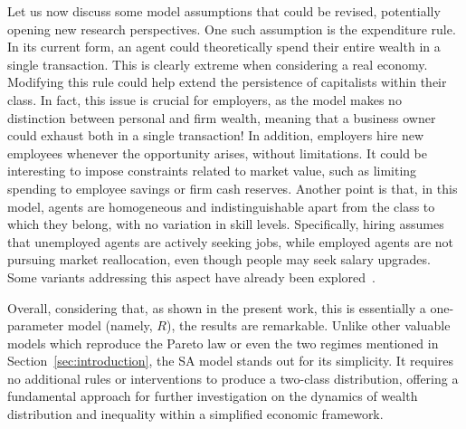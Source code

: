 Let us now discuss some model assumptions that could be revised, potentially opening new research perspectives. 
One such assumption is the expenditure rule. In its current form, an agent could theoretically spend their entire wealth in a single transaction. This is clearly extreme when considering a real economy. 
%
Modifying this rule could help extend the persistence of capitalists within their class. 
In fact, this issue is crucial for employers, as the model makes no distinction between personal and firm wealth, meaning that a business owner could exhaust both in a single transaction! 
In addition, employers hire new employees whenever the opportunity arises, without limitations. It could be interesting to impose constraints related to market value, such as limiting spending to employee savings or firm cash reserves.  Another point is that, in this model, agents are homogeneous and indistinguishable apart from the class to which they belong, with no variation in skill levels. Specifically, hiring assumes that unemployed agents are actively seeking jobs, while employed agents are not pursuing market reallocation, even though people may seek salary upgrades. Some variants addressing this aspect have already been explored~\cite{WRIGHT2010}. 
 
Overall, considering that, as shown in the present work, this is essentially a one-parameter model (namely, $R$),  the results are remarkable. 
Unlike other valuable models which reproduce the Pareto law or even the two regimes mentioned in Section~\ref{sec:introduction}, the SA model stands out for its simplicity. It requires no additional rules or interventions to produce a two-class distribution, offering a fundamental approach for further investigation on the dynamics of wealth distribution and inequality within a simplified economic framework.